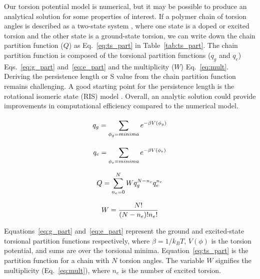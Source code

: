 \begin{itemize}
  Our torsion potential model is numerical, but it may be possible to produce an analytical solution for some properties of interest. If a polymer chain of torsion angles is described as a two-state system \cite{ucb.b1828986320110101}, where one state is a doped or excited torsion and the other state is a ground-state torsion, we can write down the chain partition function ($Q$) as Eq.~\ref{eq:ts_part} in Table~\ref{tab:ts_part}. The chain partition function is composed of the torsional partition functions ($q_g$ and $q_e$) Eqs.~\ref{eq:g_part} and~\ref{eq:e_part} and the multiplicity ($W$) Eq.~\ref{eq:mult}. Deriving the persistence length or S value from the chain partition function remains challenging. A good starting point for the persistence length is the rotational isomeric state (RIS) model \cite{Flory1989}. Overall, an analytic solution could provide improvements in computational efficiency compared to the numerical model.

  \end{itemize}

  \clearpage

  \begin{table}[t!]
  \begin{multicols}{2}
  \begin{equation}
    \large
    q_{g} = \sum_{\phi_{g}=minima}^{}e^{-\beta V(\phi_{g})}
    \label{eq:g_part}
  \end{equation}

  \begin{equation}
    \large
    q_{e} = \sum_{\phi_{e}=minima}^{}e^{-\beta V(\phi_{e})}
    \label{eq:e_part}
  \end{equation}
\end{multicols}

\begin{multicols}{2}
\begin{equation}
  \large
  Q = \sum_{n_e=0}^{N}Wq_{g}^{N-n_e}q_{e}^{n_e}
  \label{eq:ts_part}
\end{equation}

\begin{equation}
  \large
  W = \frac{N!}{(N-n_e)!n_e!}
  \label{eq:mult}
\end{equation}
\end{multicols}
\caption[Two-state Partition Function]{Equations~\ref{eq:g_part} and~\ref{eq:e_part} represent the ground and excited-state torsional partition functions respectively, where $\beta = 1/k_BT$, $V(\phi)$ is the torsion potential, and sums are over the torsional minima. Equation~\ref{eq:ts_part} is the partition function for a chain with $N$ torsion angles. The variable $W$ signifies the multiplicity (Eq.~\ref{eq:mult}), where $n_e$ is the number of excited torsion.}
\label{tab:ts_part}
\end{table}


